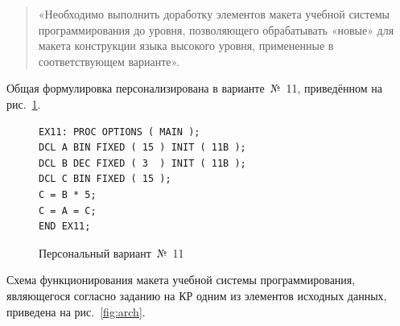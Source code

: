 \documentclass[a4paper,14pt]{extarticle}
\begin{document}
\begin{quote}
«Необходимо выполнить доработку элементов макета учебной системы
программирования до уровня, позволяющего обрабатывать «новые» для макета
конструкции языка высокого уровня, примененные в соответствующем варианте».
\end{quote}

Общая формулировка персонализирована в варианте~№~11, приведённом на рис.~\ref{fig:variant}.

\begin{figure}[H]
\centering
\begin{lstlisting}[style=PLIstyle]
EX11: PROC OPTIONS ( MAIN );
DCL A BIN FIXED ( 15 ) INIT ( 11B );
DCL B DEC FIXED ( 3  ) INIT ( 11B );
DCL C BIN FIXED ( 15 );
C = B * 5;
C = A = C;
END EX11;
\end{lstlisting}
\caption{Персональный вариант~№~11}
\label{fig:variant}
\end{figure}

Схема функционирования макета учебной системы программирования, являющегося
согласно заданию на КР одним из элементов исходных данных, приведена на рис.~\ref{fig:arch}.
\end{document}
